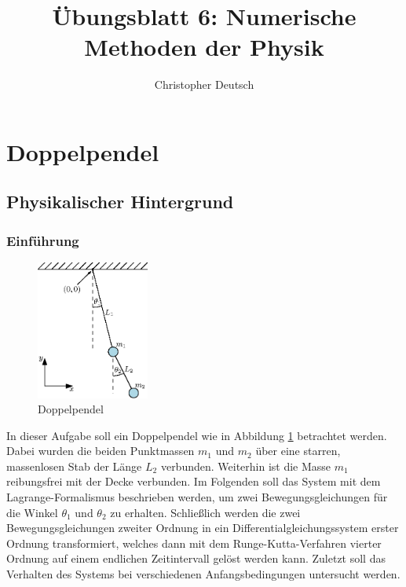 \documentclass[10pt,a4paper]{article}
\author{Christopher Deutsch}
\title{Übungsblatt 6: Numerische Methoden der Physik}
\begin{document}
\maketitle
\setcounter{section}{5}

\section{Doppelpendel}
\subsection{Physikalischer Hintergrund}
\subsubsection{Einführung}
\begin{figure}
\centering
\includegraphics[width=0.33\textwidth]{./figures/pendel.eps}
\caption{Doppelpendel}
\label{fig:doppelpendel}
\end{figure}
In dieser Aufgabe soll ein Doppelpendel wie in Abbildung \ref{fig:doppelpendel} betrachtet werden. Dabei wurden die beiden Punktmassen $m_1$ und $m_2$ über eine starren, massenlosen Stab der Länge $L_2$ verbunden. Weiterhin ist die Masse $m_1$ reibungsfrei mit der Decke verbunden. Im Folgenden soll das System mit dem Lagrange-Formalismus beschrieben werden, um zwei Bewegungsgleichungen für die Winkel $\theta_1$ und $\theta_2$ zu erhalten. Schließlich werden die zwei Bewegungsgleichungen zweiter Ordnung in ein Differentialgleichungssystem erster Ordnung transformiert, welches dann mit dem Runge-Kutta-Verfahren vierter Ordnung auf einem endlichen Zeitintervall gelöst werden kann. Zuletzt soll das Verhalten des Systems bei verschiedenen Anfangsbedingungen untersucht werden.
\end{document}

